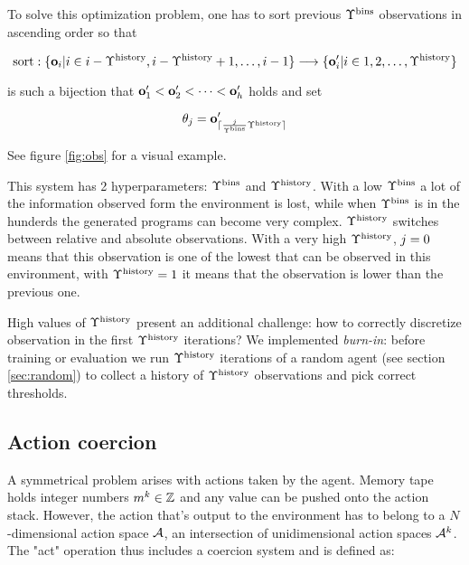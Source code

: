 To solve this optimization problem, one has to sort previous $\Upsilon^\text{bins}$ observations in ascending order so that 

\begin{equation}
    \text{sort}: \{\mathbf{o}_i | i \in i-\Upsilon^\text{history},i-\Upsilon^\text{history}+1,\dots,i-1\} \longrightarrow \{ \mathbf{o}'_i | i \in 1,2,\dots,\Upsilon^\text{history} \}
\end{equation}

is such a bijection that $\mathbf{o}'_1 < \mathbf{o}'_2 < \dots < \mathbf{o}'_h$ holds and set

\begin{equation}
    \theta_{j} = \mathbf{o}'_{\lceil \frac{j}{\Upsilon^\text{bins}} \Upsilon^\text{history} \rceil}
\end{equation}

See figure \ref{fig:obs} for a visual example.


This system has 2 hyperparameters: $\Upsilon^\text{bins}$ and $\Upsilon^\text{history}$.
With a low $\Upsilon^\text{bins}$ a lot of the information observed form the environment is lost, while when $\Upsilon^\text{bins}$ is in the hunderds the generated programs can become very complex.
$\Upsilon^\text{history}$ switches between relative and absolute observations.
With a very high $\Upsilon^\text{history}$, $j=0$ means that this observation is one of the lowest that can be observed in this environment, with $\Upsilon^\text{history}=1$ it means that the observation is lower than the previous one.

High values of $\Upsilon^\text{history}$ present an additional challenge: how to correctly discretize observation in the first $\Upsilon^\text{history}$ iterations?
We implemented \textit{burn-in}: before training or evaluation we run $\Upsilon^\text{history}$ iterations of a random agent (see section \ref{sec:random}) to collect a history of $\Upsilon^\text{history}$ observations and pick correct thresholds.

\newpage
\subsection{Action coercion}
\label{sec:act}

A symmetrical problem arises with actions taken by the agent. 
Memory tape holds integer numbers $m^k \in \mathbb{Z}$ and any value can be pushed onto the action stack.
However, the action that's output to the environment has to belong to a $N$-dimensional action space $\mathcal{A}$, an intersection of unidimensional action spaces $\mathcal{A}^k$.
The "act" operation thus includes a coercion system and is defined as:

